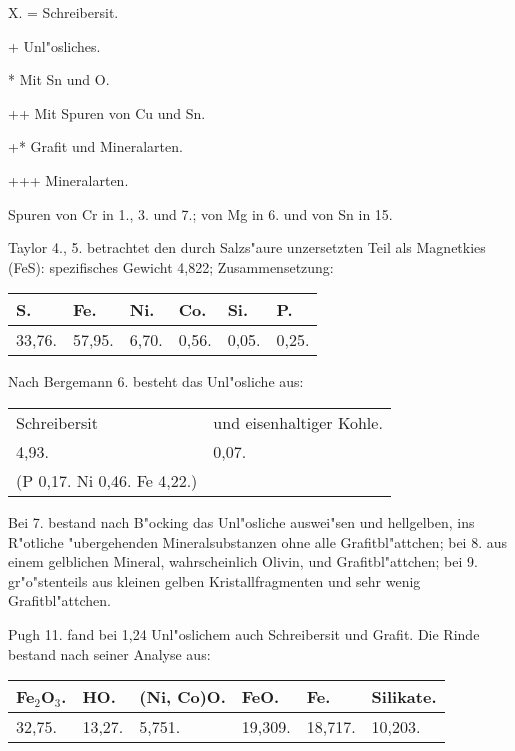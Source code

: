 \documentclass[a4paper, 11pt, oneside]{article}
\begin{document}
X. = Schreibersit.

+ Unl"osliches.

* Mit Sn und O.

++ Mit Spuren von Cu und Sn.

+* Grafit und Mineralarten.

+++ Mineralarten.

Spuren von Cr in 1., 3. und 7.; von Mg in 6. und von Sn in 15.

Taylor 4., 5. betrachtet den durch Salzs"aure unzersetzten Teil als Magnetkies (FeS): spezifisches Gewicht 4,822; Zusammensetzung:
\begin{table}[H]
    \centering
    \begin{tabular}{l l l l l l}
        S. & Fe. & Ni. & Co. & Si. & P. \\ \hline
        33,76. & 57,95. & 6,70. & 0,56. & 0,05. & 0,25. \\
    \end{tabular}
\end{table}

Nach Bergemann 6. besteht das Unl"osliche aus:
\begin{table}[H]
    \centering
    \begin{tabular}{l l}
        Schreibersit & und eisenhaltiger Kohle. \\
        4,93. & 0,07. \\
        (P 0,17. Ni 0,46. Fe 4,22.) & \\
    \end{tabular}
\end{table}

Bei 7. bestand nach B"ocking das Unl"osliche auswei"sen und hellgelben, ins R"otliche "ubergehenden Mineralsubstanzen ohne alle Grafitbl"attchen; bei 8. aus einem gelblichen Mineral, wahrscheinlich Olivin, und Grafitbl"attchen; bei 9. gr"o"stenteils aus kleinen gelben Kristallfragmenten und sehr wenig Grafitbl"attchen.

Pugh 11. fand bei 1,24 Unl"oslichem auch Schreibersit und Grafit. Die Rinde bestand nach seiner Analyse aus:
\begin{table}[H]
    \centering
    \begin{tabular}{l l l l l l}
        Fe$_{2}$O$_{3}$. & HO. & (Ni, Co)O. & FeO. & Fe. & Silikate. \\ \hline
        32,75. & 13,27. & 5,751. & 19,309. & 18,717. & 10,203. \\
    \end{tabular}
\end{table}
\end{document}
